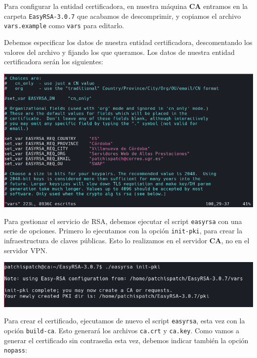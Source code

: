 \documentclass[11pt,a4paper]{article}
\begin{document}
Para configurar la entidad certificadora, en nuestra máquina \textbf{CA} entramos en la carpeta \texttt{EasyRSA-3.0.7} que acabamos de descomprimir, y copiamos el archivo \texttt{vars.example} como \texttt{vars} para editarlo. 

Debemos especificar los datos de nuestra entidad certificadora, descomentando los valores del archivo y fijando los que queramos. Los datos de nuestra entidad certificadora serán los siguientes:

\medskip

\begin{center}
\includegraphics[scale=0.4]{vars.png}
\end{center}

Para gestionar el servicio de RSA, debemos ejecutar el script \texttt{easyrsa} con una serie de opciones. Primero lo ejecutamos con la opción \texttt{init-pki}, para crear la infraestructura de claves públicas. Esto lo realizamos en el servidor \textbf{CA}, no en el servidor VPN.

\medskip

\begin{center}
\includegraphics[scale=0.4]{init-pki.png}
\end{center}

\medskip

Para crear el certificado, ejecutamos de nuevo el script \texttt{easyrsa}, esta vez con la opción \texttt{build-ca}. Esto generará los archivos \texttt{ca.crt} y \texttt{ca.key}. Como vamos a generar el certificado sin contraseña esta vez, debemos indicar también la opción \texttt{nopass}:
\end{document}
